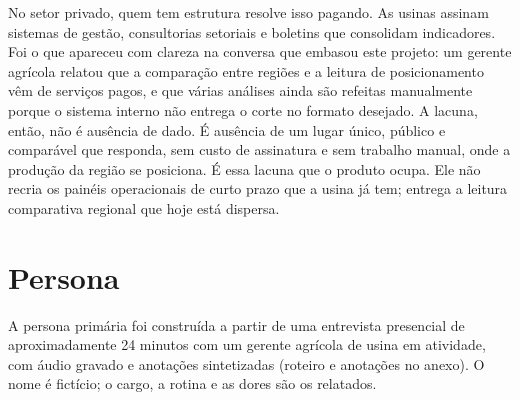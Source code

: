 \documentclass[11pt,a4paper]{article}
\begin{document}
No setor privado, quem tem estrutura resolve isso pagando. As usinas assinam sistemas de
gestão, consultorias setoriais e boletins que consolidam indicadores. Foi o que apareceu com
clareza na conversa que embasou este projeto: um gerente agrícola relatou que a comparação
entre regiões e a leitura de posicionamento vêm de serviços pagos, e que várias análises
ainda são refeitas manualmente porque o sistema interno não entrega o corte no formato
desejado. A lacuna, então, não é ausência de dado. É ausência de um lugar único, público e
comparável que responda, sem custo de assinatura e sem trabalho manual, onde a produção da
região se posiciona. É essa lacuna que o produto ocupa. Ele não recria os painéis
operacionais de curto prazo que a usina já tem; entrega a leitura comparativa regional que
hoje está dispersa.

\section{Persona}

A persona primária foi construída a partir de uma entrevista presencial de aproximadamente
24 minutos com um gerente agrícola de usina em atividade, com áudio gravado e anotações
sintetizadas (roteiro e anotações no anexo). O nome é fictício; o cargo, a rotina e as dores
são os relatados.
\end{document}
